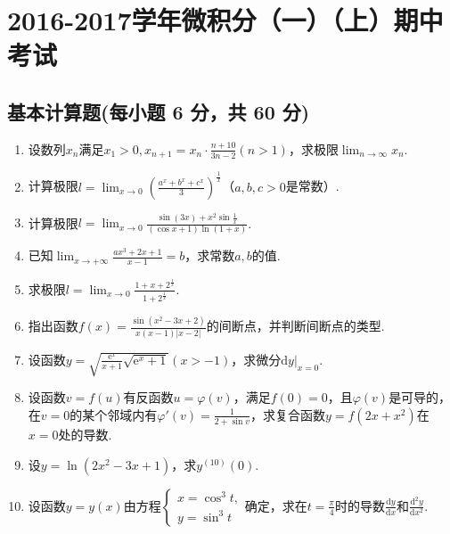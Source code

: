 \documentclass[../main.tex]{subfiles}
\begin{document}
\chapter{2016-2017学年微积分（一）（上）期中考试}

\section{基本计算题(每小题 6 分，共 60 分)}
\begin{enumerate}
    \item 设数列$x_{n}$满足$x_{1}>0,x_{n+1}=x_{n}\cdot\frac{n+10}{3n-2}(n>1)$，求极限$\lim
              _{n\to\infty}x_{n}$.
          \vspace{11em}

    \item 计算极限$l=\lim_{x\to 0}\left(\frac{a^{x}+b^{x}+c^{x}}{3}\right)^{\frac{1}{x}}$（$a
              ,b,c>0$是常数）.
          \vspace{10em}

    \item 计算极限$l=\lim_{x\to 0}\frac{\sin(3x)+x^{2}\sin\frac{1}{x}}{(\cos x+1)\ln(1+x)}$.
          \vspace{11em}

    \item 已知$\lim_{x\to+\infty}\frac{ax^{3}+2x+1}{x-1}=b$，求常数$a,b$的值.
          \vspace{10em}

    \item 求极限$l=\lim_{x\to0}\frac{1+x+2^{\frac{1}{x}}}{1+2^{\frac{1}{x}}}$.
          \vspace{10em}

    \item 指出函数$f(x)=\frac{\sin(x^{2}-3x+2)}{x(x-1)|x-2|}$的间断点，并判断间断点的类型.
          \vspace{10em}

    \item 设函数$y=\sqrt{\frac{\mathrm{e}^{x}}{x+1}\sqrt{\mathrm{e}^{x}+1}}(x>-1)$，求微分$\left
              .\mathrm{d}y\right |_{x=0}$.
          \vspace{9em}

    \item 设函数$v=f(u)$有反函数$u=\varphi(v)$，满足$f(0)=0$，且$\varphi(v)$是可导的，在$v
              =0$的某个邻域内有$\varphi'(v)=\frac{1}{2+\sin v}$，求复合函数$y=f(2x+x^{2})$在$x
              =0$处的导数.
          \vspace{9em}

    \item 设$y=\ln(2x^{2}-3x+1)$，求$y^{(10)}(0)$.
          \vspace{8em}

    \item 设函数$y=y(x)$由方程$\begin{cases}
                  x=\cos^{3} t, \\
                  y=\sin^{3} t
              \end{cases}$确定，求在$t=\frac{\pi}{4}$时的导数$\frac{\mathrm{d}y}{\mathrm{d}x}$和$\frac{\mathrm{d}^{2}y}{\mathrm{d}x^{2}}$.
          \vspace{8em}
\end{enumerate}
\end{document}
